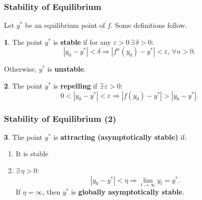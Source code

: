 \documentclass[10pt,usenames,dvipsnames]{beamer}
\theoremstyle{definition}
\newtheorem{definition}{\translate{Definition}}
\begin{document}
\begin{frame}[fragile]
\frametitle{Stability of Equilibrium}
Let $y^{*}$ be an equilibrium point of $f$. Some definitions follow.
\begin{definition}
	The point $y^{*}$ is \textbf{stable} if for any $\varepsilon > 0\,\exists\, \delta > 0$:
\[
	|y_{0} - y^{*}| < \delta \Rightarrow |f^{n}(y_{0}) - y^{*}| < \varepsilon, \, \forall n > 0.
\]

Otherwise, $y^{*}$ is \textbf{unstable}.
\end{definition}

\begin{definition}
	The point $y^{*}$ is \textbf{repelling} if $\exists\,\varepsilon > 0$:
\[
	0 < |y_{0} - y^{*}| < \varepsilon \Rightarrow |f(y_{0}) - y^{*}| > |y_{0} - y^{*}|.
\]
\end{definition}
\end{frame}

\begin{frame}[fragile]
\frametitle{Stability of Equilibrium (2)}
\begin{definition}
	The point $y^{*}$ is \textbf{attracting (asymptotically stable)} if:
	\begin{enumerate}
		\item It is stable
		\item $\exists\,\eta > 0$:
		\[
			|y_{0} - y^{*}| < \eta \Rightarrow \lim_{t\to\infty}y_{t} = y^{*}.
		\]
		If $\eta = \infty$, then $y^{*}$ is \textbf{globally asymptotically stable}.
	\end{enumerate}		 
\end{definition}
\end{frame}
\end{document}
